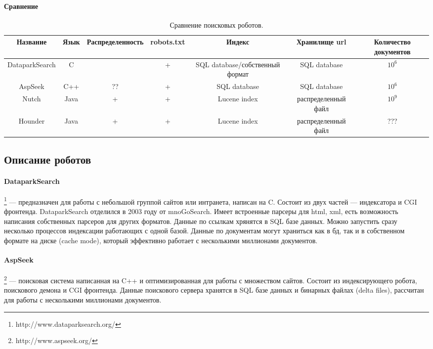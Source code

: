 \paragraph{Сравнение}
\begin{table}[h]
\caption{\label{tab:crawlers}Сравнение поисковых роботов.}
\begin{center}
\begin{turn}{90}
\begin{tabular}{|c|c|c|c|c|c|c|}
\hline
Название & Язык & Распределенность & robots.txt & Индекс & Хранилище url & Количество документов\\
\hline
DataparkSearch & C & ~ & + & SQL database/собственный формат & SQL database & $10^{6}$\\
\hline
AspSeek & C++ & ?? & + & SQL database & SQL database & $10^{6}$\\
\hline
Nutch & Java & + & + & Lucene index & распределенный файл & $10^{9}$\\
\hline
Hounder & Java & + & + & Lucene index & распределенный файл & ???\\
\hline
\end{tabular}
\end{turn}
\end{center}
\end{table}


\subsection{Описание роботов}
\paragraph{DataparkSearch}\footnote{http://www.dataparksearch.org/} --- предназначен для работы с небольшой группой сайтов или интранета, написан на C. Состоит из двух частей --- индексатора и CGI фронтенда. DataparkSearch отделился в 2003 году от mnoGoSearch. Имеет встроенные парсеры для html, xml, есть возможность написания собственных парсеров для других форматов. Данные по ссылкам хрянятся в SQL базе данных. Можно запустить сразу несколько процессов индексации работающих с одной базой. Данные по документам могут храниться как в бд, так и в собственном формате на диске (cache mode), который эффективно работает с несколькими миллионами документов.
\paragraph{AspSeek}\footnote{http://www.aspseek.org/} --- поисковая система написанная на C++ и оптимизированная для работы с множеством сайтов. Состоит из индексирующего робота, поискового демона и CGI фронтенда. Данные поискового сервера хранятся в SQL базе данных и бинарных файлах (delta files), рассчитан для работы с несколькими миллионами документов.
